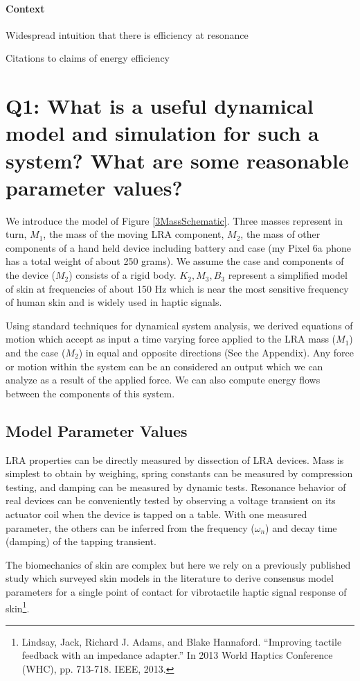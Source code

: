 \documentclass[letterpaper,11pt]{article}
\begin{document}
\paragraph{Context}

    Widespread intuition that there is efficiency at resonance

    Citations to claims of energy efficiency


\section{Q1: What is a useful dynamical model and simulation for such a system? What are some reasonable parameter values?}

We introduce the model of Figure \ref{3MassSchematic}.
Three masses represent in turn,
$M_1$, the mass of the moving LRA component,
$M_2$, the mass of other components of a hand held device including battery
and case
(my Pixel 6a phone
has a total weight of about 250 grams).
We assume the case and components of the device ($M_2$)
consists of   a rigid body.
$K_2, M_3, B_3$ represent a simplified model of skin at frequencies of about 150 Hz which is
near the most sensitive frequency of human skin and is widely used in haptic signals.

Using standard techniques for dynamical system analysis, we derived   equations
of motion   which accept as input a time varying force
applied to the LRA mass ($M_1$) and the case ($M_2$) in equal and opposite directions
(See the Appendix).   Any force or motion within the system can be an considered
an output which we can
analyze as a result of the applied force.  We can also compute energy flows between
the components of this system.

\subsection{Model Parameter Values}
LRA properties can be directly measured by dissection of LRA devices.  Mass is simplest to obtain by weighing, spring constants can be measured by
compression testing, and damping can be measured by dynamic tests.
Resonance behavior of real devices can be conveniently tested by observing
a voltage transient on its actuator coil when the device is tapped on a table.   With one measured parameter, the others can be inferred from the
frequency ($\omega_n$) and decay time (damping) of the tapping transient.

The biomechanics of skin are complex but here we rely on a previously published study which surveyed skin models in the literature to
derive consensus model parameters for a single point of contact for vibrotactile haptic signal response of skin\footnote{Lindsay, Jack, Richard J. Adams, and Blake Hannaford. ``Improving tactile feedback with an impedance adapter.'' In 2013 World Haptics Conference (WHC), pp. 713-718. IEEE, 2013.
}.
\end{document}
